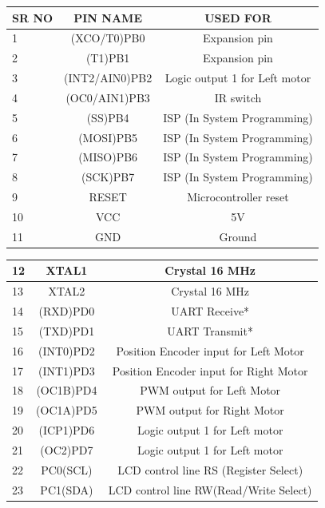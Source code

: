 \documentclass[a4paper,12pt,oneside]{book}
\begin{document}
\begin{itemize}
\begin{tabular*}{\textwidth}{|l|c|c|}
	\hline
	SR NO & PIN NAME & USED FOR \\
	\hline
	1 & (XCO/T0)PB0 & Expansion pin\\
	\hline
	2 & (T1)PB1 & Expansion pin\\
	\hline
	3 & (INT2/AIN0)PB2 & Logic output 1 for Left motor\\
	\hline
	4 & (OC0/AIN1)PB3 & IR switch \\
	\hline
	5 & (SS)PB4 & ISP (In System Programming) \\
	\hline
	6 & (MOSI)PB5 & ISP (In System Programming) \\
	\hline
	7 & (MISO)PB6 & ISP (In System Programming) \\
	\hline
	8 & (SCK)PB7 & ISP (In System Programming) \\
	\hline
	9 & RESET & Microcontroller reset \\
	\hline
	10 & VCC & 5V \\
	\hline
	11 & GND & Ground \\
	\hline
\end{tabular*}	

\begin{tabular*}{\textwidth}{|l|c|c|}
	12 & XTAL1 & Crystal 16 MHz \\
	\hline
	13 & XTAL2 & Crystal 16 MHz \\
	\hline
	14 & (RXD)PD0 & UART Receive* \\
	\hline
	15 & (TXD)PD1 & UART Transmit* \\
	\hline
	16 & (INT0)PD2 & Position Encoder input for Left Motor \\
	\hline
	17 & (INT1)PD3 & Position Encoder input for Right Motor \\
	\hline
	18 & (OC1B)PD4 & PWM output for Left Motor \\
	\hline
	19 & (OC1A)PD5 & PWM output for Right Motor  \\
	\hline
	20 & (ICP1)PD6 & Logic output 1 for Left motor \\
	\hline
	21 & (OC2)PD7 & Logic output 1 for Left motor \\
	\hline
	22 & PC0(SCL) & LCD control line RS (Register Select) \\
	\hline
	23 & PC1(SDA) & LCD control line RW(Read/Write Select) \\
	\hline
\end{tabular*}	


\end{itemize}
\end{document}
